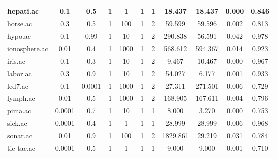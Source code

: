 \begin{table}[htbp]
\begin{tabular}{|l|c|c|c|c|c|c||c|c|c|c|}
		\hline
		hepati.ac      & 0.1      & 0.5         & 1              & 1                   & 1             & 1             & 18.437         & 18.437         & 0.000          & 0.846          \\
		\hline
		horse.ac       & 0.3      & 0.5         & 1              & 100                 & 1             & 2             & 59.599         & 59.596         & 0.002          & 0.813          \\
		\hline
		hypo.ac        & 0.1      & 0.99        & 1              & 10                  & 1             & 2             & 290.838        & 56.591         & 0.042          & 0.978          \\
		\hline
		ionosphere.ac  & 0.01     & 0.4         & 1              & 1000                & 1             & 2             & 568.612        & 594.367        & 0.014          & 0.923          \\
		\hline
		iris.ac        & 0.1      & 0.3         & 1              & 10                  & 1             & 2             & 9.467          & 10.467         & 0.000          & 0.967          \\
		\hline
		labor.ac       & 0.3      & 0.9         & 1              & 10                  & 1             & 2             & 54.027         & 6.177          & 0.001          & 0.933          \\
		\hline
		led7.ac        & 0.1      & 0.0001      & 1              & 1000                & 1             & 2             & 27.311         & 271.501        & 0.006          & 0.729          \\
		\hline
		lymph.ac       & 0.01     & 0.5         & 1              & 1000                & 1             & 2             & 168.905        & 167.611        & 0.004          & 0.796          \\
		\hline
		pima.ac        & 0.0001   & 0.7         & 1              & 10                  & 1             & 1             & 8.000          & 3.270          & 0.000          & 0.753          \\
		\hline
		sick.ac        & 0.0001   & 0.4         & 1              & 1                   & 1             & 1             & 28.999         & 28.999         & 0.006          & 0.968          \\
		\hline
		sonar.ac       & 0.01     & 0.9         & 1              & 100                 & 1             & 2             & 1829.861       & 29.219         & 0.031          & 0.784          \\
		\hline
		tic-tac.ac     & 0.0001   & 0.5         & 1              & 1                   & 1             & 1             & 9.000          & 9.000          & 0.001          & 0.710          \\

\end{tabular}
\end{table}
